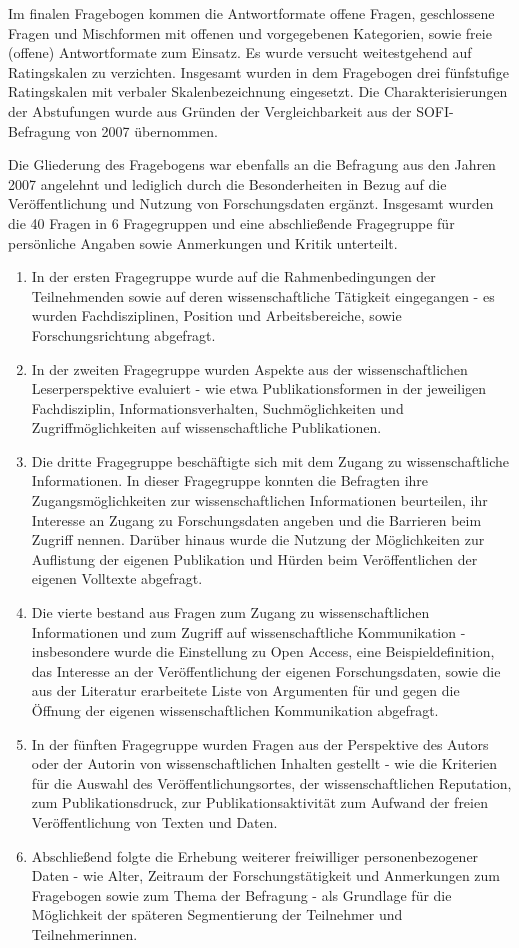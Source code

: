Im finalen Fragebogen kommen die Antwortformate offene Fragen, geschlossene Fragen und Mischformen mit offenen und vorgegebenen Kategorien, sowie freie (offene) Antwortformate zum Einsatz. Es wurde versucht weitestgehend auf Ratingskalen zu verzichten. Insgesamt wurden in dem Fragebogen drei fünfstufige Ratingskalen mit verbaler Skalenbezeichnung eingesetzt. Die Charakterisierungen der Abstufungen wurde aus Gründen der Vergleichbarkeit aus der SOFI-Befragung von 2007 übernommen.

Die Gliederung des Fragebogens war ebenfalls an die Befragung aus den Jahren 2007 angelehnt und lediglich durch die Besonderheiten in Bezug auf die Veröffentlichung und Nutzung von Forschungsdaten ergänzt. Insgesamt wurden die 40 Fragen in 6 Fragegruppen und eine abschließende Fragegruppe für persönliche Angaben sowie Anmerkungen und Kritik unterteilt.

\begin{enumerate}
\item In der ersten Fragegruppe wurde auf die Rahmenbedingungen der Teilnehmenden sowie auf deren wissenschaftliche Tätigkeit eingegangen - es wurden Fachdisziplinen, Position und Arbeitsbereiche, sowie Forschungsrichtung abgefragt.
\item In der zweiten Fragegruppe wurden Aspekte aus der wissenschaftlichen Leserperspektive evaluiert - wie etwa Publikationsformen in der jeweiligen Fachdisziplin, Informationsverhalten, Suchmöglichkeiten und Zugriffmöglichkeiten auf wissenschaftliche Publikationen.
\item Die dritte Fragegruppe beschäftigte sich mit dem Zugang zu wissenschaftliche Informationen. In dieser Fragegruppe konnten die Befragten ihre Zugangsmöglichkeiten zur wissenschaftlichen Informationen beurteilen, ihr Interesse an Zugang zu Forschungsdaten angeben und die Barrieren beim Zugriff nennen. Darüber hinaus wurde die Nutzung der Möglichkeiten zur Auflistung der eigenen Publikation und Hürden beim Veröffentlichen der eigenen Volltexte abgefragt.
\item Die vierte bestand aus Fragen zum Zugang zu wissenschaftlichen Informationen und zum Zugriff auf wissenschaftliche Kommunikation - insbesondere wurde die Einstellung zu Open Access, eine Beispieldefinition, das Interesse an der Veröffentlichung der eigenen Forschungsdaten, sowie die aus der Literatur erarbeitete Liste von Argumenten für und gegen die Öffnung der eigenen wissenschaftlichen Kommunikation abgefragt.
\item In der fünften Fragegruppe wurden Fragen aus der Perspektive des Autors oder der Autorin von wissenschaftlichen Inhalten gestellt - wie die Kriterien für die Auswahl des Veröffentlichungsortes, der wissenschaftlichen Reputation, zum Publikationsdruck, zur Publikationsaktivität zum Aufwand der freien Veröffentlichung von Texten und Daten.
\item Abschließend folgte die Erhebung weiterer freiwilliger personenbezogener Daten - wie Alter, Zeitraum der Forschungstätigkeit und Anmerkungen zum Fragebogen sowie zum Thema der Befragung - als Grundlage für die Möglichkeit der späteren Segmentierung der Teilnehmer und Teilnehmerinnen.
\end{enumerate}

